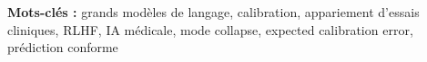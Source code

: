 
\vspace{0.5cm}
\noindent\textbf{Mots-clés :} grands modèles de langage, calibration,
appariement d'essais cliniques, RLHF, IA médicale, mode collapse,
expected calibration error, prédiction conforme

\cleardoublepage
